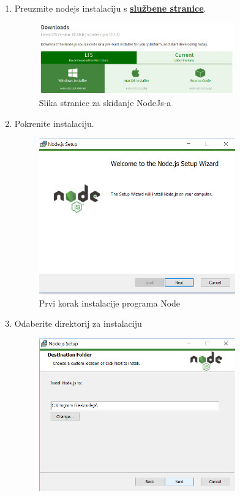 		\begin{enumerate}
			\item Preuzmite nodejs instalaciju s \textbf{\href{https://nodejs.org/en/download/}{službene stranice}}.
			\begin{figure}[h]
				\centering
				\includegraphics[width=0.8\textwidth]{slike/npm_install/0.png}
				\caption{Slika stranice za skidanje NodeJs-a}
			\end{figure}
			\item Pokrenite instalaciju.
			\begin{figure}[h]
				\centering
				\includegraphics[width=0.8\textwidth]{slike/npm_install/1.png}
				\caption{Prvi korak instalacije programa Node}
			\end{figure}
			\eject
			\item Odaberite direktorij za instalaciju
			\begin{figure}[h]
				\centering
				\includegraphics[width=0.8\textwidth]{slike/npm_install/2.png}

\end{figure}
\end{enumerate}
